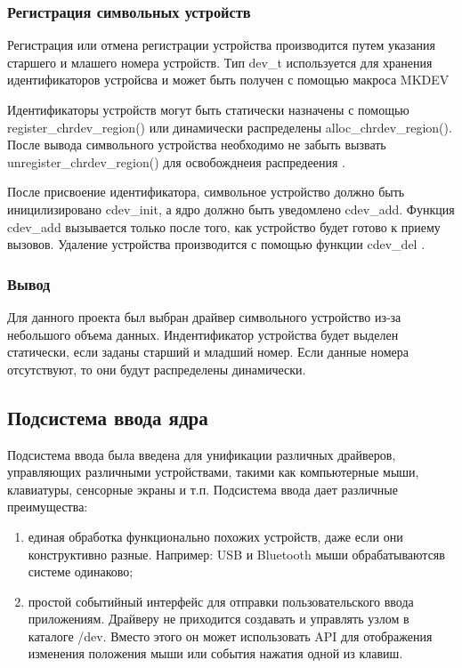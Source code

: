 \subsubsection{Регистрация символьных устройств}
Регистрация или отмена регистрации устройства производится путем указания старшего и млашего номера устройств.
Тип dev\_t используется для хранения идентификаторов устройсва и может быть получен с помощью макроса MKDEV

Идентификаторы устройств могут быть статически назначены с помощью register\_chrdev\_region() или динамически распределены alloc\_chrdev\_region().
После вывода символьного устройства необходимо не забыть вызвать unregister\_chrdev\_region() для освобожднеия распредеения \cite{7}.

После присвоение идентификатора, символьное устройство должно быть иницилизировано cdev\_init, а ядро должно быть уведомлено cdev\_add.
Функция cdev\_add вызывается только после того, как устройство будет готово к приему вызовов.
Удаление устройства производится с помощью функции cdev\_del \cite{7}.

\subsubsection{Вывод}
Для данного проекта был выбран драйвер символьного устройство из-за небольшого объема данных.
Индентификатор устройства будет выделен статически, если заданы старший и младший номер.
Если данные номера отсутствуют, то они будут распределены динамически.

\subsection{Подсистема ввода ядра}
Подсистема ввода была введена для унификации различных драйверов, управляющих различными устройствами, такими как компьютерные мыши, клавиатуры, сенсорные экраны и т.п. Подсистема ввода дает различные преимущества:
\begin{enumerate}
	\item единая обработка функционально похожих устройств, даже если они конструктивно разные. 
	Например: USB и Bluetooth мыши обрабатываютсяв системе одинаково;
	\item простой событийный интерфейс для отправки пользовательского ввода приложениям. 
	Драйверу не приходится создавать и управлять узлом в каталоге /dev. 
	Вместо этого он может использовать API для отображения изменения положения мыши или события нажатия одной из клавиш. 
\end{enumerate}

